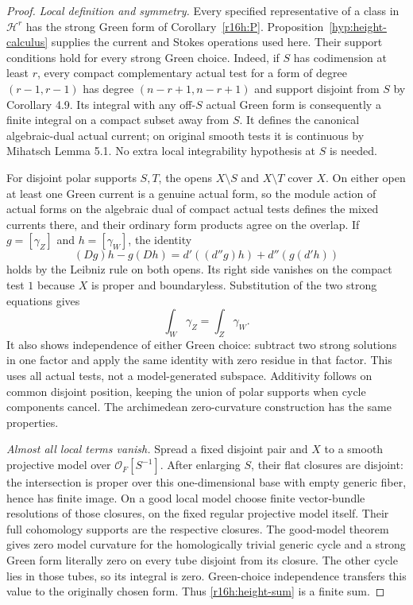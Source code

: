 \documentclass[11pt,a4paper]{article}
\theoremstyle{definition}
\theoremstyle{remark}
\numberwithin{equation}{section}
\begin{document}
\begin{proof}
\emph{Local definition and symmetry.}
Every specified representative of a class in $\mathcal H^r$ has the
strong Green form of Corollary~\ref{r16h:P}. Proposition~\ref{hyp:height-calculus}
supplies the current and Stokes operations used here. Their support
conditions hold for every strong Green choice. Indeed, if $S$ has codimension at least
$r$, every compact complementary actual test for a form of degree
$(r-1,r-1)$ has degree $(n-r+1,n-r+1)$ and support disjoint from
$S$ by Corollary 4.9. Its integral with any off-$S$ actual Green
form is consequently a finite integral on a compact subset away
from $S$. It defines the canonical algebraic-dual actual current;
on original smooth tests it is continuous by Mihatsch Lemma 5.1.
No extra local integrability hypothesis at $S$ is needed.

For disjoint polar supports $S,T$, the opens $X\setminus S$ and
$X\setminus T$ cover $X$. On either open at least one Green current
is a genuine actual form, so the module action of actual forms on
the algebraic dual of compact actual tests defines the mixed
currents there, and their ordinary form products agree on the overlap.
If $g=[\gamma_Z]$ and $h=[\gamma_W]$, the identity
\[
 (Dg)h-g(Dh)=d'((d''g)h)+d''(g(d'h))
\]
holds by the Leibniz rule on both opens. Its right side vanishes
on the compact test $1$ because $X$ is proper and boundaryless.
Substitution of the two strong equations gives
\[
                    \int_W\gamma_Z=\int_Z\gamma_W.
\]
It also shows independence of either Green choice: subtract two
strong solutions in one factor and apply the same identity with
zero residue in that factor. This uses all actual tests, not a
model-generated subspace. Additivity follows on common disjoint
position, keeping the union of polar supports when cycle components
cancel. The archimedean zero-curvature construction has the same
properties.

\emph{Almost all local terms vanish.}
Spread a fixed disjoint pair and $X$ to a smooth projective model
over $\mathcal O_F[S^{-1}]$. After enlarging $S$, their flat closures
are disjoint: the intersection is proper over this one-dimensional
base with empty generic fiber, hence has finite image. On a good
local model choose finite vector-bundle resolutions of those
closures, on the fixed regular projective model itself. Their full
cohomology supports are the respective closures. The
good-model theorem gives zero model curvature for the homologically
trivial generic cycle and a strong Green form literally zero on
every tube disjoint from its closure. The other cycle lies in those
tubes, so its integral is zero. Green-choice independence transfers
this value to the originally chosen form. Thus
\eqref{r16h:height-sum} is a finite sum.


\end{proof}
\end{document}

